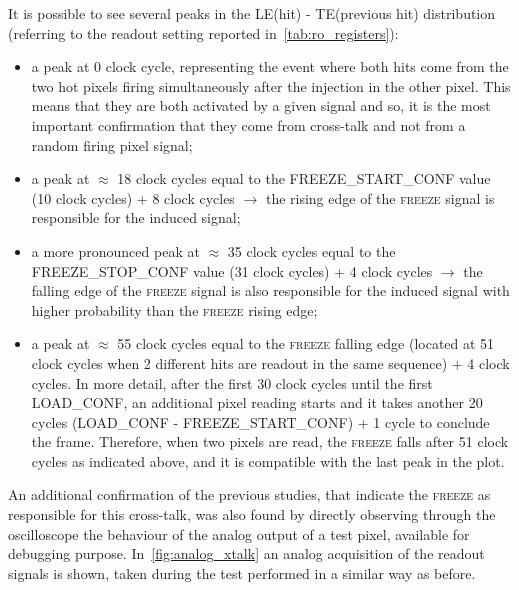 \begin{comment}
\begin{figure}[h!]
\centering
\subfigure[An example of the time information used.]
{\texttt{[image: xtalk\_time]}}\quad
\subfigure[An example of the LE(hit)-TE(previous hit) histogram.]
{\texttt{[image: xtalk\_hist]}}\\
\caption{Some results of the cross-talk studies.}
\label{fig:xtalk}
\end{figure}
\end{comment}





It is possible to see several peaks in the LE(hit) - TE(previous hit) distribution (referring to the readout setting reported in~\autoref{tab:ro_registers}):

\begin{itemize}
\item a peak at 0 clock cycle, representing the event where both hits come from the two hot pixels firing simultaneously after the injection in the other pixel. This means that they are both activated by a given signal and so, it is the most important confirmation that they come from cross-talk and not from a random firing pixel signal;
\item a peak at $\approx$ 18 clock cycles equal to the FREEZE\_START\_CONF value  (10 clock cycles) + 8 clock cycles $\rightarrow$ the rising edge of the \textsc{freeze} signal is responsible for the induced signal;
\item a more pronounced peak at $\approx$ 35 clock cycles equal to the FREEZE\_STOP\_CONF value (31 clock cycles) + 4 clock cycles $\rightarrow$ the falling edge of the \textsc{freeze} signal is also responsible for the induced signal with higher probability than the \textsc{freeze} rising edge;
\item a peak at $\approx$ 55 clock cycles equal to the \textsc{freeze} falling edge (located at 51 clock cycles when 2 different hits are readout in the same sequence) + 4 clock cycles. In more detail, after the first 30 clock cycles until the first LOAD\_CONF, an additional pixel reading starts and it takes another 20 cycles (LOAD\_CONF - FREEZE\_START\_CONF) + 1 cycle to conclude the frame. Therefore, when two pixels are read, the \textsc{freeze}  falls after 51 clock cycles as indicated above, and it is compatible with the last peak in the plot.
\end{itemize}

An additional confirmation of the previous studies, that indicate the \textsc{freeze} as responsible for this cross-talk, was also found by directly observing through the oscilloscope the behaviour of the analog output of a test pixel, available for debugging purpose.    
In~\autoref{fig:analog_xtalk} an analog acquisition of the readout signals is shown, taken during the test performed in a similar way as before. 

